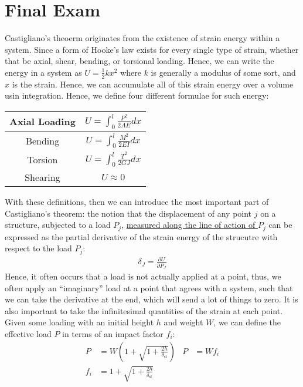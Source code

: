 \documentclass{article}
\begin{document}
\section*{Final Exam}


Castigliano's theoerm originates from the existence of strain energy within a system.
Since a form of Hooke's law exists for every single type of strain, whether that be 
axial, shear, bending, or torsional loading. Hence, we can write the energy in a 
system as $U = \frac{1}{2}kx^2$ where $k$ is generally a modulus of some sort, and $x$
is the strain. Hence, we can accumulate all of this strain energy over a volume usin 
integration. Hence, we define four different formulae for such energy:\\
{\renewcommand{\arraystretch}{2}%
\begin{tabular}{ | c | c | }
    \hline
    Axial Loading & $\displaystyle U = \int_0^l \frac{P^2}{2AE}dx$\\
    \hline 
    Bending & $\displaystyle U = \int_0^l \frac{M^2}{2EI}dx$\\
    \hline 
    Torsion & $\displaystyle U = \int_0^l \frac{T^2}{2GJ}dx$\\
    \hline
    Shearing & $\displaystyle U \approx 0$\\
    \hline
\end{tabular}}\gap
With these definitions, then we can introduce the most important part of Castigliano's theorem:
the notion that the displacement of any point $j$ on a structure, subjected to a load $P_j$,
\underline{measured along the line of action of $P_j$} can be expressed as the partial 
derivative of the strain energy of the strucutre with respect to the load $P_j$:
\begin{align*}
    \delta_J = \frac{\partial U}{\partial P_J}
\end{align*}
Hence, it often occurs that a load is not actually applied at a point, thus, we often apply
an ``imaginary'' load at a point that agrees with a system, such that we can take the 
derivative at the end, which will send a lot of things to zero.
\gap
It is also important to take the infinitesimal quantities of the strain at each point.
\gap
{}
Given some loading with an initial height $h$ and weight $W$, we can define the effective load $P$
in terms of an impact factor $f_i$:
\begin{align*}
    P &= W \left(1 + \sqrt{1 + \frac{2h}{\delta_{\textrm{st}}}}\right) & P &= Wf_i\\
    f_i &= 1 + \sqrt{1 + \frac{2h}{\delta_\textrm{st}}}
\end{align*}

\pagebreak

\end{document}
